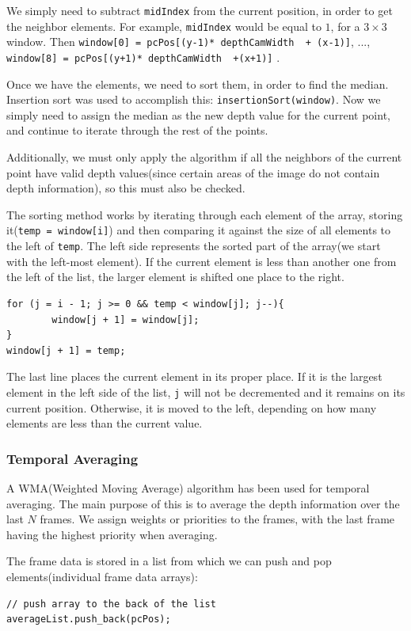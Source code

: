 \documentclass[]{article}
\begin{document}
We simply need to subtract \verb|midIndex| from the current position, in order to get the neighbor elements. For example, \verb|midIndex| would be equal to $1$, for a $3 \times 3$ window. Then \verb|window[0] = pcPos[(y-1)* depthCamWidth  + (x-1)]|, ..., \verb|window[8] = pcPos[(y+1)* depthCamWidth  +(x+1)]| .

Once we have the elements, we need to sort them, in order to find the median. Insertion sort was used to accomplish this: \verb|insertionSort(window)|. Now we simply need to assign the median as the new depth value for the current point, and continue to iterate through the rest of the points.

Additionally, we must only apply the algorithm if all the neighbors of the current point have valid depth values(since certain areas of the image do not contain depth information), so this must also be checked.

The sorting method works by iterating through each element of the array, storing it(\verb|temp = window[i]|) and then comparing it against the size of all elements to the left of \verb|temp|. The left side represents the sorted part of the array(we start with the left-most element). If the current element is less than another one from the left of the list, the larger element is shifted one place to the right.
\begin{verbatim}
for (j = i - 1; j >= 0 && temp < window[j]; j--){
		window[j + 1] = window[j];
}
window[j + 1] = temp;
\end{verbatim}

The last line places the current element in its proper place. If it is the largest element in the left side of the list, \verb|j| will not be decremented and it remains on its current position. Otherwise, it is moved to the left, depending on how many elements are less than the current value. 		


\subsubsection{Temporal Averaging}

A WMA(Weighted Moving Average) algorithm has been used for temporal averaging. The main purpose of this is to average the depth information over the last $N$ frames. We assign weights or priorities to the frames, with the last frame having the highest priority when averaging.

The frame data is stored in a list from which we can push and pop elements(individual frame data arrays):
\begin{verbatim}
// push array to the back of the list
averageList.push_back(pcPos);
\end{verbatim}
\end{document}
